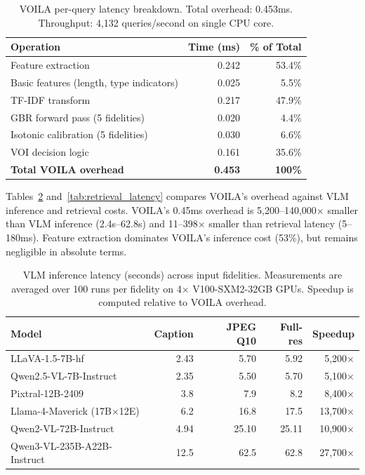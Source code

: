 \begin{table}[h]
\centering
\small
\begin{tabular}{lrr}
\toprule
\textbf{Operation} & \textbf{Time (ms)} & \textbf{\% of Total} \\
\midrule
Feature extraction & 0.242 & 53.4\% \\
\quad Basic features (length, type indicators) & 0.025 & 5.5\% \\
\quad TF-IDF transform & 0.217 & 47.9\% \\
GBR forward pass (5 fidelities) & 0.020 & 4.4\% \\
Isotonic calibration (5 fidelities) & 0.030 & 6.6\% \\
VOI decision logic & 0.161 & 35.6\% \\
\midrule
\textbf{Total VOILA overhead} & \textbf{0.453} & \textbf{100\%} \\
\bottomrule
\end{tabular}
\caption{VOILA per-query latency breakdown. Total overhead: 0.453ms. Throughput: 4,132 queries/second on single CPU core.}
\label{tab:inference_latency}
\end{table}

Tables~\ref{tab:vlm_comparison} and~\ref{tab:retrieval_latency} compares VOILA's overhead against VLM inference and retrieval costs. VOILA's 0.45ms overhead is 5,200--140,000× smaller than VLM inference (2.4s--62.8s) and 11--398× smaller than retrieval latency (5--180ms). Feature extraction dominates VOILA's inference cost (53\%), but remains negligible in absolute terms.

\begin{table}[h]
\centering
\small
\begin{tabular}{lrrrr}
\toprule
\textbf{Model} & \textbf{Caption} & \textbf{JPEG Q10} & \textbf{Full-res} & \textbf{Speedup} \\
\midrule
LLaVA-1.5-7B-hf & 2.43 & 5.70 & 5.92 & 5{,}200$\times$ \\
Qwen2.5-VL-7B-Instruct & 2.35 & 5.50 & 5.70 & 5{,}100$\times$ \\
Pixtral-12B-2409 & 3.8 & 7.9 & 8.2 & 8{,}400$\times$ \\
Llama-4-Maverick (17B$\times$12E) & 6.2 & 16.8 & 17.5 & 13{,}700$\times$ \\
Qwen2-VL-72B-Instruct & 4.94 & 25.10 & 25.11 & 10{,}900$\times$ \\
Qwen3-VL-235B-A22B-Instruct & 12.5 & 62.5 & 62.8 & 27{,}700$\times$ \\
\bottomrule
\end{tabular}
\caption{VLM inference latency (seconds) across input fidelities.
Measurements are averaged over 100 runs per fidelity on 4$\times$ V100-SXM2-32GB GPUs.
Speedup is computed relative to \textsc{VOILA} overhead.}
\label{tab:vlm_comparison}
\end{table}

